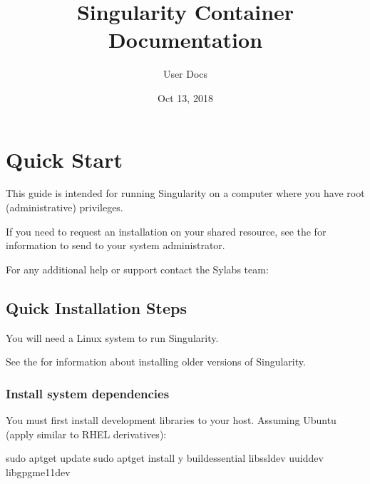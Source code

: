 \documentclass[letterpaper,10pt,english]{sphinxmanual}
\title{Singularity Container Documentation}
\date{Oct 13, 2018}
\author{User Docs}
\begin{document}
\maketitle
\sphinxtableofcontents
{}\label{\detokenize{index::doc}}



\chapter{Quick Start}
\label{\detokenize{quick_start:quick-start}}\label{\detokenize{quick_start:id1}}\label{\detokenize{quick_start::doc}}\label{\detokenize{quick_start:sec-quickstart}}
This guide is intended for running Singularity on a computer where you
have root (administrative) privileges.

If you need to request an installation on your shared resource, see the
 for
information to send to your system administrator.

For any additional help or support contact the Sylabs team:


\section{Quick Installation Steps}
\label{\detokenize{quick_start:quick-installation-steps}}\label{\detokenize{quick_start:quick-installation}}
You will need a Linux system to run Singularity.

See the  for information about installing
older versions of Singularity.


\subsection{Install system dependencies}
\label{\detokenize{quick_start:install-system-dependencies}}
You must first install development libraries to your host. Assuming Ubuntu
(apply similar to RHEL derivatives):

%
\begin{sphinxVerbatim}[commandchars=\\\{\}]
\PYGZdl{} sudo apt\PYGZhy{}get update \PYGZam{}\PYGZam{} sudo apt\PYGZhy{}get install \PYGZhy{}y \PYGZbs{}
    build\PYGZhy{}essential \PYGZbs{}
    libssl\PYGZhy{}dev \PYGZbs{}
    uuid\PYGZhy{}dev \PYGZbs{}
    libgpgme11\PYGZhy{}dev
\end{sphinxVerbatim}
\end{document}
